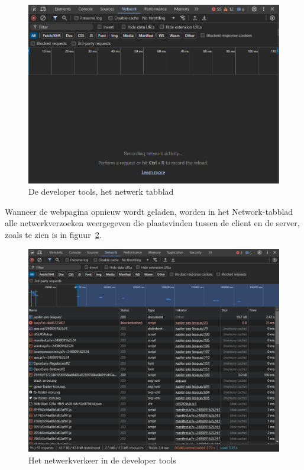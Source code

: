 \begin{figure}[h]
    \centering
    \includegraphics[width=\linewidth]{graphics/DevTools1.png}
    \caption{De developer tools, het netwerk tabblad}
    \label{fig:networktab}
\end{figure}

Wanneer de webpagina opnieuw wordt geladen, worden in het Network-tabblad alle netwerkverzoeken weergegeven die plaatsvinden tussen de client en de server, zoals te zien is in figuur~\ref{fig:networktab2}.

\begin{figure}[h]
    \centering
    \includegraphics[width=\linewidth]{graphics/DevTools2.png}
    \caption{Het netwerkverkeer in de developer tools}
    \label{fig:networktab2}
\end{figure}

